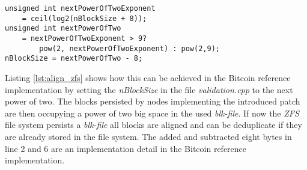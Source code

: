 \begin{minipage}{\linewidth}
\begin{lstlisting}[caption=Aligning the block size in the Bitcoin reference implementation for \textit{ZFS}, label={lst:align_zfs}, basicstyle=\ttfamily, captionpos=b]
unsigned int nextPowerOfTwoExponent
	= ceil(log2(nBlockSize + 8));
unsigned int nextPowerOfTwo
	= nextPowerOfTwoExponent > 9?
		pow(2, nextPowerOfTwoExponent) : pow(2,9);
nBlockSize = nextPowerOfTwo - 8;
\end{lstlisting}
\end{minipage}

Listing \ref{lst:align_zfs} shows how this can be achieved in the Bitcoin reference implementation by setting the \textit{nBlockSize} in the file \textit{validation.cpp} to the next power of two.
The blocks persisted by nodes implementing the introduced patch are then occupying a power of two big space in the used \textit{blk-file}.
If now the \textit{ZFS} file system persists a \textit{blk-file} all blocks are aligned and can be deduplicate if they are already stored in the file system.
The added and subtracted eight bytes in line 2 and 6 are an implementation detail in the Bitcoin reference implementation.
